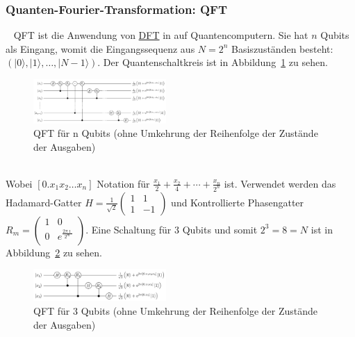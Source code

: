 \subsubsection{\textbf{Quanten-Fourier-Transformation: QFT}}\label{sec:QFT}~\newline
QFT ist die Anwendung von \hyperref[sec:DFT]{DFT} in auf Quantencomputern. Sie hat \(n\) Qubits als Eingang, womit die Eingangssequenz aus \(N = 2^n\) Basiszuständen besteht: \(\left(|0\rangle,|1\rangle,\dots,|N-1\rangle\right)\). Der Quantenschaltkreis ist in Abbildung~\ref{fig:QFT_n_Qubits} zu sehen.
\begin{figure}[hb]
	\centering
	\includegraphics[width=0.45\textwidth]{sections/felix/Q_fourier_nqubits.png}
	\caption{QFT für n Qubits (ohne Umkehrung der Reihenfolge der Zustände der Ausgaben)\cite{wiki_q_fourier_nqubitspng}} %
	
	\label{fig:QFT_n_Qubits}
\end{figure}
\\Wobei \(\left[0.x_1 x_2 \dots x_n\right]\) Notation für \(\frac{x_1}{2}+\frac{x_2}{4}+\cdots+\frac{x_n}{2^n}\) ist.
Verwendet werden das Hadamard-Gatter \(H = \frac{1}{\sqrt{2}}\begin{pmatrix}
	1 &  1\\
	1 & -1
\end{pmatrix}\) und Kontrollierte Phasengatter \(R_m = \begin{pmatrix}
	1 & 0\\
	0 & e^{\frac{2\pi\imath}{2^m}}\\
\end{pmatrix}\).
Eine Schaltung für \(3\) Qubits und somit \(2^3 = 8 = N\) ist in Abbildung~\ref{fig:QFT_3_Qubits} zu sehen.%
\begin{figure}[hb]
	\centering
	\includegraphics[width=0.45\textwidth]{sections/felix/Q_fourier_3qubits.png}
	\caption{QFT für 3 Qubits (ohne Umkehrung der Reihenfolge der Zustände der Ausgaben)\cite{wiki_q_fourier_3qubitspng}}
	\label{fig:QFT_3_Qubits}
\end{figure}
